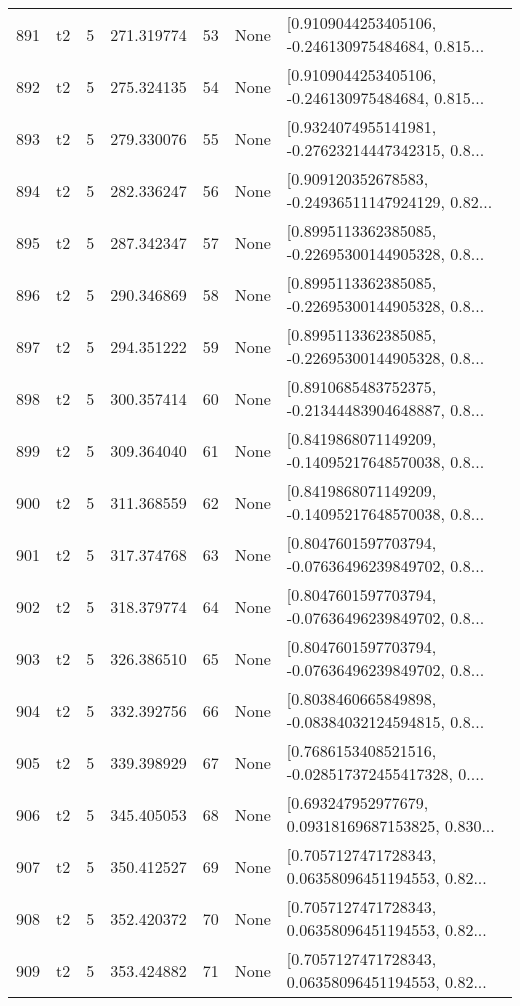 \begin{tabular}{lllrlll}
891 &  t2 &   5 &   271.319774 &   53 &  None &  [0.9109044253405106, -0.246130975484684, 0.815... \\
892 &  t2 &   5 &   275.324135 &   54 &  None &  [0.9109044253405106, -0.246130975484684, 0.815... \\
893 &  t2 &   5 &   279.330076 &   55 &  None &  [0.9324074955141981, -0.27623214447342315, 0.8... \\
894 &  t2 &   5 &   282.336247 &   56 &  None &  [0.909120352678583, -0.24936511147924129, 0.82... \\
895 &  t2 &   5 &   287.342347 &   57 &  None &  [0.8995113362385085, -0.22695300144905328, 0.8... \\
896 &  t2 &   5 &   290.346869 &   58 &  None &  [0.8995113362385085, -0.22695300144905328, 0.8... \\
897 &  t2 &   5 &   294.351222 &   59 &  None &  [0.8995113362385085, -0.22695300144905328, 0.8... \\
898 &  t2 &   5 &   300.357414 &   60 &  None &  [0.8910685483752375, -0.21344483904648887, 0.8... \\
899 &  t2 &   5 &   309.364040 &   61 &  None &  [0.8419868071149209, -0.14095217648570038, 0.8... \\
900 &  t2 &   5 &   311.368559 &   62 &  None &  [0.8419868071149209, -0.14095217648570038, 0.8... \\
901 &  t2 &   5 &   317.374768 &   63 &  None &  [0.8047601597703794, -0.07636496239849702, 0.8... \\
902 &  t2 &   5 &   318.379774 &   64 &  None &  [0.8047601597703794, -0.07636496239849702, 0.8... \\
903 &  t2 &   5 &   326.386510 &   65 &  None &  [0.8047601597703794, -0.07636496239849702, 0.8... \\
904 &  t2 &   5 &   332.392756 &   66 &  None &  [0.8038460665849898, -0.08384032124594815, 0.8... \\
905 &  t2 &   5 &   339.398929 &   67 &  None &  [0.7686153408521516, -0.028517372455417328, 0.... \\
906 &  t2 &   5 &   345.405053 &   68 &  None &  [0.693247952977679, 0.09318169687153825, 0.830... \\
907 &  t2 &   5 &   350.412527 &   69 &  None &  [0.7057127471728343, 0.06358096451194553, 0.82... \\
908 &  t2 &   5 &   352.420372 &   70 &  None &  [0.7057127471728343, 0.06358096451194553, 0.82... \\
909 &  t2 &   5 &   353.424882 &   71 &  None &  [0.7057127471728343, 0.06358096451194553, 0.82... \\

\end{tabular}

